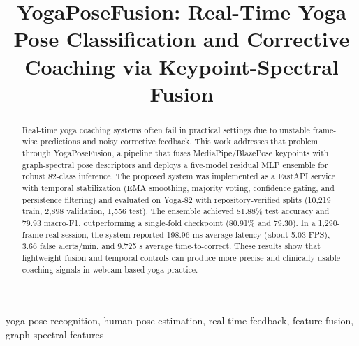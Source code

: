 \documentclass[conference]{IEEEtran}
\begin{document}
\title{YogaPoseFusion: Real-Time Yoga Pose Classification and Corrective Coaching via Keypoint-Spectral Fusion}

\author{
}

\maketitle

\begin{abstract}
Real-time yoga coaching systems often fail in practical settings due to unstable frame-wise predictions and noisy corrective feedback. This work addresses that problem through YogaPoseFusion, a pipeline that fuses MediaPipe/BlazePose keypoints with graph-spectral pose descriptors and deploys a five-model residual MLP ensemble for robust 82-class inference. The proposed system was implemented as a FastAPI service with temporal stabilization (EMA smoothing, majority voting, confidence gating, and persistence filtering) and evaluated on Yoga-82 with repository-verified splits (10{,}219 train, 2{,}898 validation, 1{,}556 test). The ensemble achieved 81.88\% test accuracy and 79.93 macro-F1, outperforming a single-fold checkpoint (80.91\% and 79.30). In a 1{,}290-frame real session, the system reported 198.96 ms average latency (about 5.03 FPS), 3.66 false alerts/min, and 9.725 s average time-to-correct. These results show that lightweight fusion and temporal controls can produce more precise and clinically usable coaching signals in webcam-based yoga practice.
\end{abstract}

\begin{IEEEkeywords}
yoga pose recognition, human pose estimation, real-time feedback, feature fusion, graph spectral features
\end{IEEEkeywords}
\end{document}
